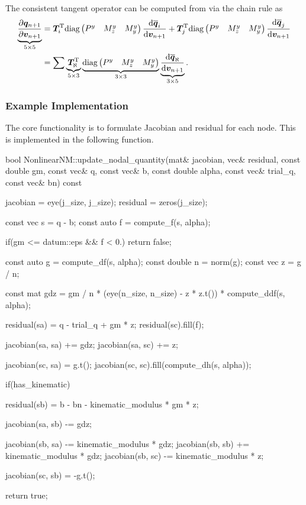 The consistent tangent operator can be computed from  via the chain rule as
\begin{gather}
\begin{split}
\underbrace{\dfrac{\partial{\bm{q}_{n+1}}}{\partial{\bm{v}_{n+1}}}}_{5\times5}&=\bm{T}_i^{\mathrm{T}}\text{diag}\left(\begin{matrix}
P^y&M_z^y&M_y^y
\end{matrix}\right)\dfrac{\mathrm{d}\bm{\overline{q}}_i}{\mathrm{d}\bm{v}_{n+1}}+\bm{T}_j^{\mathrm{T}}\text{diag}\left(\begin{matrix}
P^y&M_z^y&M_y^y
\end{matrix}\right)\dfrac{\mathrm{d}\bm{\overline{q}}_j}{\mathrm{d}\bm{v}_{n+1}}\\
&=\sum\underbrace{\bm{T}_\aleph^{\mathrm{T}}}_{5\times3}
\underbrace{\text{diag}\left(\begin{matrix}
P^y&M_z^y&M_y^y
\end{matrix}\right)}_{3\times3}
\underbrace{\dfrac{\mathrm{d}\bm{\overline{q}}_\aleph}{\mathrm{d}\bm{v}_{n+1}}}_{3\times5}.
\end{split}
\end{gather}
\subsubsection{Example Implementation}
The core functionality is to formulate Jacobian and residual for each node. This is implemented in the following function.
\begin{cppcode}
bool NonlinearNM::update_nodal_quantity(mat& jacobian, vec& residual, const double gm, const vec& q, const vec& b, const double alpha, const vec& trial_q, const vec& bn) const {
    jacobian = eye(j_size, j_size);
    residual = zeros(j_size);

    const vec s = q - b;
    const auto f = compute_f(s, alpha);

    if(gm <= datum::eps && f < 0.) return false;

    const auto g = compute_df(s, alpha);
    const double n = norm(g);
    const vec z = g / n;

    const mat gdz = gm / n * (eye(n_size, n_size) - z * z.t()) * compute_ddf(s, alpha);

    residual(sa) = q - trial_q + gm * z;
    residual(sc).fill(f);

    jacobian(sa, sa) += gdz;
    jacobian(sa, sc) += z;

    jacobian(sc, sa) = g.t();
    jacobian(sc, sc).fill(compute_dh(s, alpha));

    if(has_kinematic) {
        residual(sb) = b - bn - kinematic_modulus * gm * z;

        jacobian(sa, sb) -= gdz;

        jacobian(sb, sa) -= kinematic_modulus * gdz;
        jacobian(sb, sb) += kinematic_modulus * gdz;
        jacobian(sb, sc) -= kinematic_modulus * z;

        jacobian(sc, sb) = -g.t();
    }

    return true;
}
\end{cppcode}


